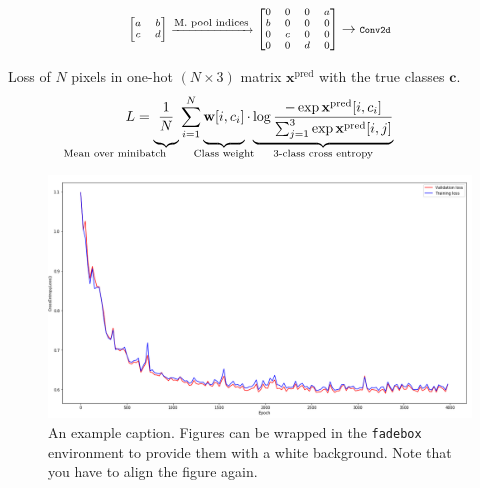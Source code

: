 \documentclass[
    ,title     = {{Image Segmentation for Smart Agriculture}}
    ,subject   = {{This is the subject of my work}}
    ,papersize = {{a1paper}}
    ,nocrop
]{dtuposter}
\begin{document}
\begin{dtupostercontent}
\begin{equation*}\label{key}
\scriptsize
\begin{bmatrix}a&b\\c&d\end{bmatrix} \xrightarrow{\text{\scriptsize M. pool indices}}
\begin{bmatrix}0&0&0&a\\b&0&0&0\\0&c&0&0\\0&0&d&0\end{bmatrix} 
\rightarrow 
\texttt{\scriptsize Conv2d}
\end{equation*}


Loss of \(N\) pixels in one-hot \((N \times  3)\) matrix \(\mathbf x^\text{pred}\) with the true classes \(\mathbf c\).
\[
L = \underbrace{
\vphantom{\sum_{i}}
\frac 1 N}
_{\mathllap{\text{Mean over minibatch}}}
\sum_{\mathclap {i=1}}^{N}
\underbrace{ 
\vphantom{\sum_{i}}
\mathbf{w}[i, c_i]}
_{\mathclap{\text{Class weight}}}  
\cdot 
\underbrace{
\log 
\frac
{-\exp\mathbf x^\text{pred}[i, c_i]}
{\sum_{j=1}^{3}\exp\mathbf x^\text{pred}[i, j]}
}_{\mathclap{\text{3-class cross entropy}}}
\]
\begin{figure}
	\begin{center}
			\includegraphics[width=\linewidth,origin=c]{loss}
	\end{center}
	\caption{An example caption. Figures can be wrapped in the \texttt{fadebox} 
		environment to provide them with a white background. Note that you have to align the 
		figure again.}\label{fig:example2}
\end{figure}


\end{dtupostercontent}
\end{document}

